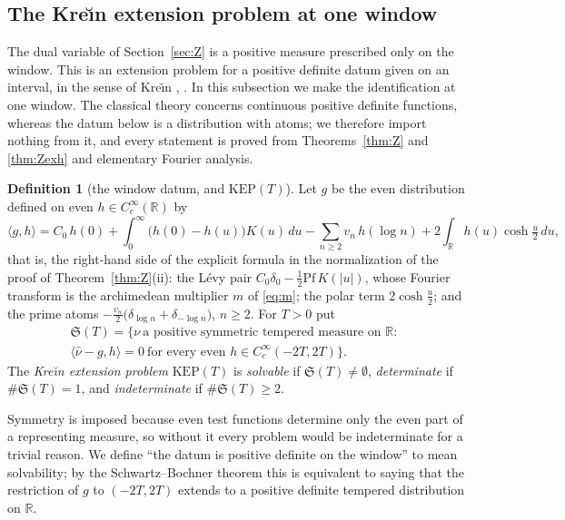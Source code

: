 \documentclass[11pt]{amsart}
\theoremstyle{definition}
\newtheorem{definition}[theorem]{Definition}
\theoremstyle{remark}
\newcommand{\R}{\mathbb R}
\newcommand{\nuh}{\widehat\nu}
\begin{document}
\subsection{The Kre\u{\i}n extension problem at one window}\label{subsec:KEP}
The dual variable of Section~\ref{sec:Z} is a positive measure prescribed only on the window. This
is an extension problem for a positive definite datum given on an interval, in the sense of
Kre\u{\i}n \cite{Krein1940}, \cite[Ch.~2]{Sasvari1994}. In this subsection we make the identification
at one window. The classical theory concerns continuous positive
definite functions, whereas the datum below is a distribution with atoms; we therefore import
nothing from it, and every statement is proved from Theorems~\ref{thm:Z} and \ref{thm:Zexh} and
elementary Fourier analysis.

\begin{definition}[the window datum, and $\mathrm{KEP}(T)$]\label{def:KEP}
Let $g$ be the even distribution defined on even $h\in C_c^\infty(\R)$ by
\begin{equation}\label{eq:gdatum}
\langle g,h\rangle=C_0\,h(0)+\int_0^\infty\big(h(0)-h(u)\big)K(u)\,du-\sum_{n\ge2}v_n\,h(\log n)
+2\int_\R h(u)\cosh\tfrac u2\,du,
\end{equation}
that is, the right-hand side of the explicit formula in the normalization of the proof of
Theorem~\ref{thm:Z}(ii): the L\'evy pair $C_0\delta_0-\frac12\mathrm{Pf}\,K(|u|)$, whose Fourier
transform is the archimedean multiplier $m$ of \eqref{eq:m}; the polar term $2\cosh\frac u2$; and
the prime atoms $-\frac{v_n}2\big(\delta_{\log n}+\delta_{-\log n}\big)$, $n\ge2$. For $T>0$ put
\[
\begin{aligned}
\mathfrak S(T)=\Big\{\nu\ \text{a positive symmetric tempered measure on }\R:\ \\
\langle\nuh-g,h\rangle=0\ \text{for every even }h\in C_c^\infty(-2T,2T)\Big\}.
\end{aligned}
\]
The \emph{Kre\u{\i}n extension problem} $\mathrm{KEP}(T)$ is \emph{solvable} if
$\mathfrak S(T)\ne\emptyset$, \emph{determinate} if $\#\mathfrak S(T)=1$, and \emph{indeterminate}
if $\#\mathfrak S(T)\ge2$.
\end{definition}
Symmetry is imposed because even test functions
determine only the even part of a representing measure, so without it every problem would be
indeterminate for a trivial reason. We define ``the datum is positive definite on the window'' to
mean solvability; by the Schwartz--Bochner theorem this is equivalent to saying that the restriction
of $g$ to $(-2T,2T)$ extends to a positive definite tempered distribution on $\R$.
\end{document}

